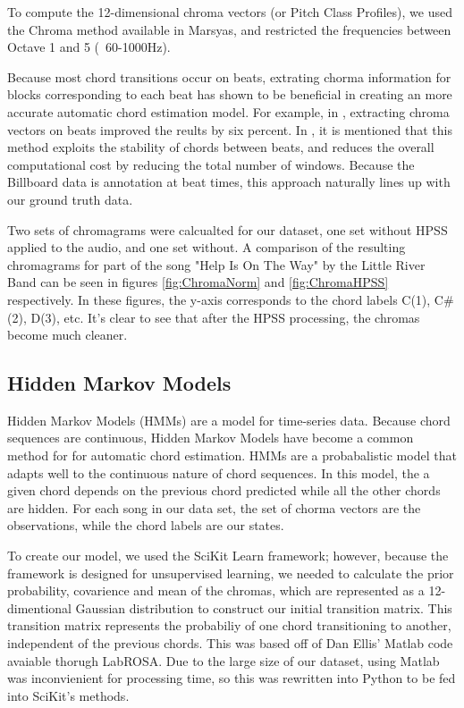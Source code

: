 \documentclass{article}
\begin{document}
To compute the 12-dimensional chroma vectors (or Pitch Class Profiles), we used
the Chroma method available in Marsyas, and restricted the frequencies between
Octave 1 and 5 (~60-1000Hz).

Because most chord transitions occur on beats, extrating chorma information for
blocks corresponding to each beat has shown to be beneficial in creating an
more accurate automatic chord estimation model. For example, in \cite{Zenz:20},
extracting chroma vectors on beats improved the reults by six percent. In
\cite{McVicor:00}, it is mentioned that this method exploits the stability of
chords between beats, and reduces the overall computational cost by reducing
the total number of windows. Because the Billboard data is annotation at beat
times, this approach naturally lines up with our ground truth data.

Two sets of chromagrams were calcualted for our dataset, one set without HPSS
applied to the audio, and one set without. A comparison of the resulting
chromagrams for part of the song "Help Is On The Way" by the Little River Band
can be seen in figures \ref{fig:ChromaNorm} and \ref{fig:ChromaHPSS}
respectively. In these figures, the y-axis corresponds to the chord labels
C(1), C\#(2), D(3), etc. It's clear to see that after the HPSS processing, the
chromas become much cleaner.

\subsection{Hidden Markov Models}

Hidden Markov Models (HMMs) are a model for time-series data. Because chord
sequences are continuous,  Hidden Markov Models have become a common method for
for automatic chord estimation. HMMs are a probabalistic model that adapts well
to the continuous nature of chord sequences. In this model, the a given chord
depends on the previous chord predicted while all the other chords are hidden.
For each song in our data set, the set of chorma vectors are the observations,
while the chord labels are our states.

To create our model, we used the SciKit Learn framework; however, because the
framework is designed for unsupervised learning, we needed to calculate the
prior probability, covarience and mean of the chromas, which are represented as
a 12-dimentional Gaussian distribution to construct our initial transition
matrix.  This transition matrix represents the probabiliy of one chord
transitioning to another, independent of the previous chords.  This was based
off of Dan Ellis' Matlab code avaiable thorugh LabROSA. Due to the large size
of our dataset, using Matlab was inconvienient for processing time, so this was
rewritten into Python to be fed into SciKit's methods.
\end{document}
